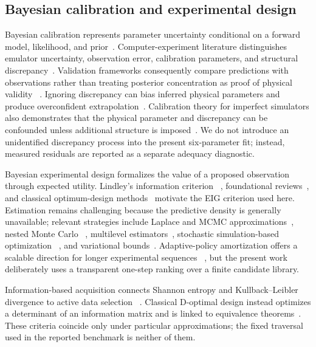 \hypertarget{bayesian-calibration-and-experimental-design}{%
\subsection{Bayesian calibration and experimental
design}\label{bayesian-calibration-and-experimental-design}}

Bayesian calibration represents parameter uncertainty conditional on a
forward model, likelihood, and prior~\citep{gelman2013}.
Computer-experiment literature distinguishes emulator uncertainty,
observation error, calibration parameters, and structural
discrepancy~\citep{sacks1989, kennedy2001}. Validation frameworks
consequently compare predictions with observations rather than treating
posterior concentration as proof of physical validity
~\citep{bayarri2007}. Ignoring discrepancy can bias inferred physical
parameters and produce overconfident
extrapolation~\citep{brynjarsdottir2014}. Calibration theory for
imperfect simulators also demonstrates that the physical parameter and
discrepancy can be confounded unless additional structure is
imposed~\citep{tuo2015, plumlee2017}. We do not introduce an
unidentified discrepancy process into the present six-parameter fit;
instead, measured residuals are reported as a separate adequacy
diagnostic.

Bayesian experimental design formalizes the value of a proposed
observation through expected utility. Lindley's information criterion
~\citep{lindley1956}, foundational
reviews~\citep{chaloner1995, ryan2016}, and classical optimum-design
methods~\citep{atkinson2007} motivate the EIG criterion used here.
Estimation remains challenging because the predictive density is
generally unavailable; relevant strategies include Laplace and MCMC
approximations~\citep{ryan2003}, nested Monte Carlo
~\citep{rainforth2018}, multilevel estimators~\citep{goda2020},
stochastic simulation-based optimization ~\citep{huan2013}, and
variational bounds~\citep{foster2019}. Adaptive-policy amortization
offers a scalable direction for longer experimental sequences
~\citep{foster2021}, but the present work deliberately uses a
transparent one-step ranking over a finite candidate library.

Information-based acquisition connects Shannon entropy and
Kullback--Leibler divergence to active data selection
~\citep{shannon1948, kullback1951, mackay1992}. Classical D-optimal
design instead optimizes a determinant of an information matrix and is
linked to equivalence theorems~\citep{kiefer1960, atkinson2007}. These
criteria coincide only under particular approximations; the fixed
traversal used in the reported benchmark is neither of them.

